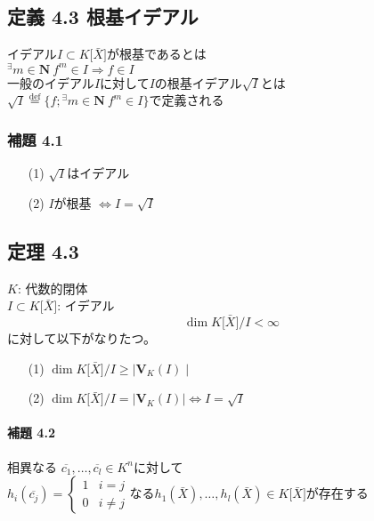 \documentclass[12pt,a4paper]{article}
\begin{document}
\subsection*{定義 4.3 根基イデアル}
  イデアル$I \subset K \lbrack \bar X \rbrack$が根基であるとは \\
  ${}^\exists m \in \mathbf{N} \ f^m \in I \Rightarrow f \in I$\\
  一般のイデアル$I$に対して$I$の根基イデアル$\sqrt{I}$とは \\
  $\sqrt{I} \overset{\text{def}}{=} \lbrace f ; {}^\exists m \in \mathbf{N} \ f^m \in I \rbrace$で定義される
  \subsubsection*{補題 4.1}
    \begin{itemize}
      \item[(1)] $\sqrt{I}$はイデアル
      \item[(2)] $I$が根基 $\Leftrightarrow I = \sqrt{I}$
    \end{itemize}

\subsection*{定理 4.3}
  $K$: 代数的閉体 \\
  $I \subset K \lbrack \bar X \rbrack$: イデアル \\
  \[ \dim K \lbrack \bar X \rbrack / I < \infty \]
  に対して以下がなりたつ。
  \begin{itemize}
    \item[(1)] $\dim K \lbrack \bar X \rbrack / I \geq \mid \mathbf{V}_K (I) \mid$ 
    \item[(2)] $\dim K \lbrack \bar X \rbrack / I = \mid \mathbf{V}_K (I) \mid \Leftrightarrow I = \sqrt{I}$ 
  \end{itemize}

  \paragraph{補題 4.2}
    相異なる $\overline{c_1}, \dots, \overline{c_l} \in K^n$に対して \\
    $ h_i (\overline{c_j}) = \begin{cases}{}
        1 & i = j \\
        0 & i \neq j
      \end{cases} $なる$h_1(\bar{X}), \ldots, h_l(\bar{X}) \in K \lbrack \bar{X} \rbrack $が存在する
\end{document}
